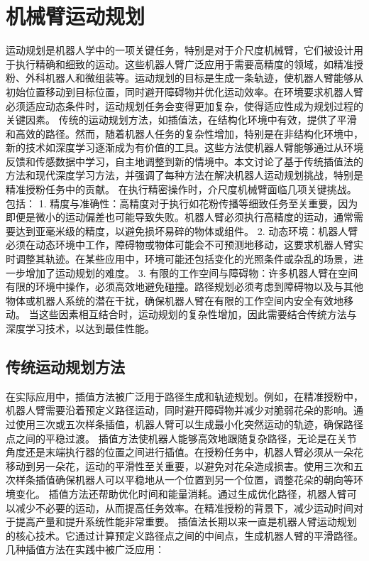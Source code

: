 \section{机械臂运动规划}
运动规划是机器人学中的一项关键任务，特别是对于介尺度机械臂，它们被设计用于执行精确和细致的运动。这些机器人臂广泛应用于需要高精度的领域，如精准授粉、外科机器人和微组装等。运动规划的目标是生成一条轨迹，使机器人臂能够从初始位置移动到目标位置，同时避开障碍物并优化运动效率。在环境要求机器人臂必须适应动态条件时，运动规划任务会变得更加复杂，使得适应性成为规划过程的关键因素。
传统的运动规划方法，如插值法，在结构化环境中有效，提供了平滑和高效的路径。然而，随着机器人任务的复杂性增加，特别是在非结构化环境中，新的技术如深度学习逐渐成为有价值的工具。这些方法使机器人臂能够通过从环境反馈和传感数据中学习，自主地调整到新的情境中。本文讨论了基于传统插值法的方法和现代深度学习方法，并强调了每种方法在解决机器人运动规划挑战，特别是精准授粉任务中的贡献。
在执行精密操作时，介尺度机械臂面临几项关键挑战。包括：
1.	精度与准确性：高精度对于执行如花粉传播等细致任务至关重要，因为即便是微小的运动偏差也可能导致失败。机器人臂必须执行高精度的运动，通常需要达到亚毫米级的精度，以避免损坏易碎的物体或组件。
2.	动态环境：机器人臂必须在动态环境中工作，障碍物或物体可能会不可预测地移动，这要求机器人臂实时调整其轨迹。在某些应用中，环境可能还包括变化的光照条件或杂乱的场景，进一步增加了运动规划的难度。
3.	有限的工作空间与障碍物：许多机器人臂在空间有限的环境中操作，必须高效地避免碰撞。路径规划必须考虑到障碍物以及与其他物体或机器人系统的潜在干扰，确保机器人臂在有限的工作空间内安全有效地移动。
当这些因素相互结合时，运动规划的复杂性增加，因此需要结合传统方法与深度学习技术，以达到最佳性能。



\subsection{传统运动规划方法}

在实际应用中，插值方法被广泛用于路径生成和轨迹规划。例如，在精准授粉中，机器人臂需要沿着预定义路径运动，同时避开障碍物并减少对脆弱花朵的影响。通过使用三次或五次样条插值，机器人臂可以生成最小化突然运动的轨迹，确保路径点之间的平稳过渡。
插值方法使机器人能够高效地跟随复杂路径，无论是在关节角度还是末端执行器的位置之间进行插值。在授粉任务中，机器人臂必须从一朵花移动到另一朵花，运动的平滑性至关重要，以避免对花朵造成损害。使用三次和五次样条插值确保机器人可以平稳地从一个位置到另一个位置，调整花朵的朝向等环境变化。
插值方法还帮助优化时间和能量消耗。通过生成优化路径，机器人臂可以减少不必要的运动，从而提高任务效率。在精准授粉的背景下，减少运动时间对于提高产量和提升系统性能非常重要。
插值法长期以来一直是机器人臂运动规划的核心技术。它通过计算预定义路径点之间的中间点，生成机器人臂的平滑路径。几种插值方法在实践中被广泛应用：

